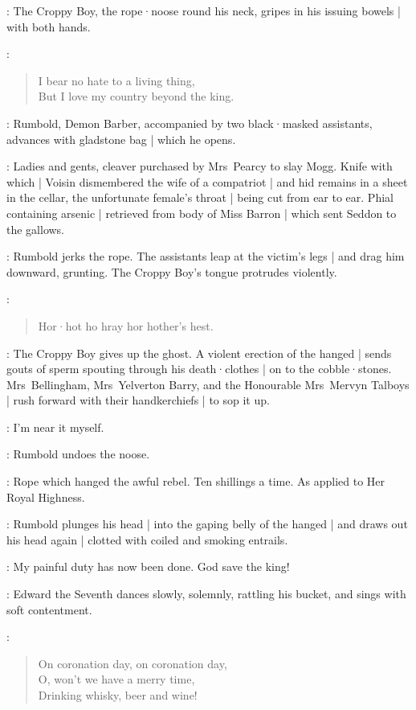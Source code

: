 :
The Croppy Boy,
the rope·noose round his neck,
gripes in his issuing bowels |
with both hands.

\CroppyBoy:
\begin{verse}
    I bear no hate to a living thing,\\
    But I love my country beyond the king.
\end{verse}

:
Rumbold,
Demon Barber,
accompanied by two black·masked assistants,
advances with gladstone bag |
which he opens.

\RumboldDemonBarber:
Ladies and gents,
cleaver purchased by Mrs~Pearcy to slay Mogg.
Knife with which |
Voisin dismembered the wife of a compatriot |
and hid remains in a sheet in the cellar,
%
the unfortunate female's throat |
being cut from ear to ear.
Phial containing arsenic |
retrieved from body of Miss Barron |
which sent Seddon to the gallows.

:
Rumbold jerks the rope.
The assistants leap at the victim's legs |
and drag him downward,
grunting.
The Croppy Boy's tongue protrudes violently.

\CroppyBoy:
\begin{verse}
    Hor·hot ho hray hor hother's hest.
\end{verse}

:
The Croppy Boy gives up the ghost.
A violent erection of the hanged |
sends gouts of sperm spouting through his death·clothes |
on to the cobble·stones.
Mrs~Bellingham,
Mrs~Yelverton Barry,
%
and the Honourable Mrs~Mervyn Talboys |
rush forward with their handkerchiefs |
to sop it up.

\Rumbold:
I'm near it myself.

:
Rumbold undoes the noose.

\Rumbold:
Rope which hanged the awful rebel.
Ten shillings a time.
As applied to Her Royal Highness.

:
Rumbold plunges his head |
into the gaping belly of the hanged |
and draws out his head again |
clotted with coiled and smoking entrails.

\Rumbold:
My painful duty has now been done.
God save the king!

:
Edward the Seventh dances slowly,
solemnly,
rattling his bucket,
%
and sings with soft contentment.

\EdwardSeventh:
\begin{verse}
    On coronation day, on coronation day,\\
    O, won't we have a merry time,\\
    Drinking whisky, beer and wine!
\end{verse}

